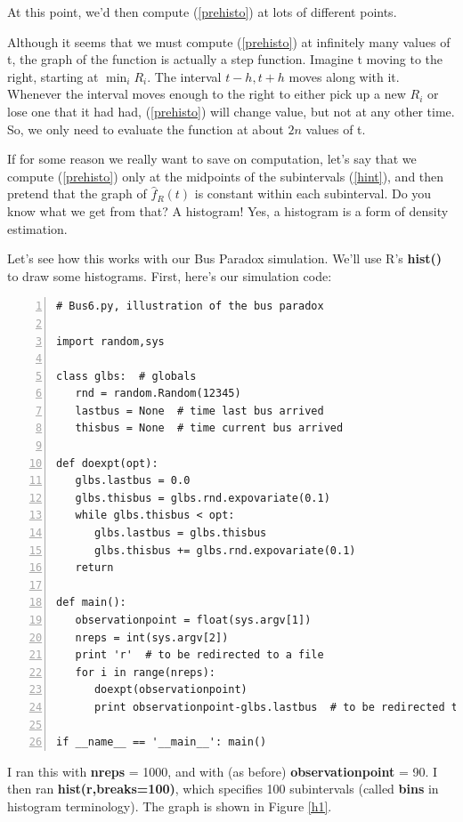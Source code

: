 At this point, we'd then compute (\ref{prehisto}) at lots of different
points.  

Although it seems that we must compute (\ref{prehisto}) at infinitely
many values of t, the graph of the function is actually a step function.
Imagine t moving to the right, starting at $\min_iR_i$.  The interval
$t-h,t+h$ moves along with it.  Whenever the interval moves enough to
the right to either pick up a new $R_i$ or lose one that it had had,  
(\ref{prehisto}) will change value, but not at any other time.  So, we
only need to evaluate the function at about $2n$ values of t.

If for some reason we really want to save on computation, let's say that
we compute (\ref{prehisto}) only at the midpoints of the subintervals
(\ref{hint}), and then pretend that the graph of $\hat{f}_R(t)$ is
constant within each subinterval.  Do you know what we get from that?  A
histogram!  Yes, a histogram is a form of density estimation.

Let's see how this works with our Bus Paradox simulation.  We'll use R's
{\bf hist()} to draw some histograms.  First, here's our simulation
code:

\begin{Verbatim}[fontsize=\relsize{-2},numbers=left]
# Bus6.py, illustration of the bus paradox

import random,sys

class glbs:  # globals
   rnd = random.Random(12345)
   lastbus = None  # time last bus arrived
   thisbus = None  # time current bus arrived

def doexpt(opt):
   glbs.lastbus = 0.0
   glbs.thisbus = glbs.rnd.expovariate(0.1)
   while glbs.thisbus < opt:
      glbs.lastbus = glbs.thisbus
      glbs.thisbus += glbs.rnd.expovariate(0.1)
   return 

def main():
   observationpoint = float(sys.argv[1])
   nreps = int(sys.argv[2])
   print 'r'  # to be redirected to a file
   for i in range(nreps):
      doexpt(observationpoint)
      print observationpoint-glbs.lastbus  # to be redirected to a file

if __name__ == '__main__': main()
\end{Verbatim}

I ran this with {\bf nreps} = 1000, and with (as before) {\bf
observationpoint} = 90.  I then ran {\bf hist(r,breaks=100)}, which
specifies 100 subintervals (called {\bf bins} in histogram terminology).
The graph is shown in Figure \ref{h1}.

